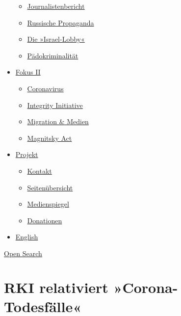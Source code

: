\begin{itemize}
  \begin{itemize}
  \tightlist
  \item
    \href{https://swprs.org/bericht-eines-journalisten/}{Journalistenbericht}
  \item
    \href{https://swprs.org/russische-propaganda/}{Russische Propaganda}
  \item
    \href{https://swprs.org/die-israel-lobby-fakten-und-mythen/}{Die
    »Israel-Lobby«}
  \item
    \href{https://swprs.org/geopolitik-und-paedokriminalitaet/}{Pädokriminalität}
  \end{itemize}
\item
  \href{https://swprs.org/migration-und-medien/}{Fokus II}

  \begin{itemize}
  \tightlist
  \item
    \href{https://swprs.org/covid-19-hinweis-ii/}{Coronavirus}
  \item
    \href{https://swprs.org/die-integrity-initiative/}{Integrity
    Initiative}
  \item
    \href{https://swprs.org/migration-und-medien/}{Migration \& Medien}
  \item
    \href{https://swprs.org/der-fall-magnitsky/}{Magnitsky Act}
  \end{itemize}
\item
  \href{https://swprs.org/kontakt/}{Projekt}

  \begin{itemize}
  \tightlist
  \item
    \href{https://swprs.org/kontakt/}{Kontakt}
  \item
    \href{https://swprs.org/uebersicht/}{Seitenübersicht}
  \item
    \href{https://swprs.org/medienspiegel/}{Medienspiegel}
  \item
    \href{https://swprs.org/donationen/}{Donationen}
  \end{itemize}
\item
  \href{https://swprs.org/contact/}{English}
\end{itemize}

\protect\hyperlink{}{Open Search}

\hypertarget{rki-relativiert-corona-todesfuxe4lle}{%
\section{RKI relativiert
»Corona-Todesfälle«}\label{rki-relativiert-corona-todesfuxe4lle}}

